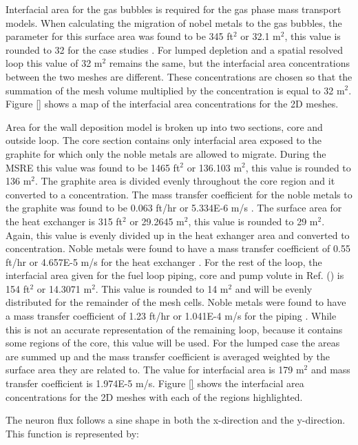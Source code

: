 Interfacial area for the gas bubbles is required for the gas phase mass transport models. When calculating the migration of nobel metals to the gas bubbles, the parameter for this surface area was found to be 345 ft$^{2}$ or 32.1 m$^{2}$, this value is rounded to 32 for the case studies \cite{kedl1972}. For lumped depletion and a spatial resolved loop this value of 32 m$^{2}$ remains the same, but the interfacial area concentrations between the two meshes are different. These concentrations are chosen so that the summation of the mesh volume multiplied by the concentration is equal to 32 m$^{2}$. Figure \ref{} shows a map of the interfacial area concentrations for the 2D meshes. 

Area for the wall deposition model is broken up into two sections, core and outside loop. The core section contains only interfacial area exposed to the graphite for which only the noble metals are allowed to migrate. During the MSRE this value was found to be 1465 ft$^{2}$ or 136.103 m$^{2}$, this value is rounded to 136 m$^{2}$. The graphite area is divided evenly throughout the core region and it converted to a concentration. The mass transfer coefficient for the noble metals to the graphite was found to be 0.063 ft/hr or 5.334E-6 m/s \cite{kedl1972}. The surface area for the heat exchanger is 315 ft$^{2}$ or 29.2645 m$^{2}$, this value is rounded to 29 m$^{2}$. Again, this value is evenly divided up in the heat exhanger area and converted to concentration. Noble metals were found to have a mass transfer coefficient of 0.55 ft/hr or 4.657E-5 m/s for the heat exchanger \cite{kedl1972}. For the rest of the loop, the interfacial area given for the fuel loop piping, core and pump volute in Ref. (\cite{kedl1972}) is 154 ft$^{2}$ or 14.3071 m$^{2}$. This value is rounded to 14 m$^{2}$ and will be evenly distributed for the remainder of the mesh cells. Noble metals were found to have a mass transfer coefficient of 1.23 ft/hr or 1.041E-4 m/s for the piping \cite{kedl1972}. While this is not an accurate representation of the remaining loop, because it contains some regions of the core, this value will be used. For the lumped case the areas are summed up and the mass transfer coefficient is averaged weighted by the surface area they are related to. The value for interfacial area is 179 m$^{2}$ and mass transfer coefficient is 1.974E-5 m/s. Figure \ref{} shows the interfacial area concentrations for the 2D meshes with each of the regions highlighted. 

The neuron flux follows a sine shape in both the x-direction and the y-direction. This function is represented by:


